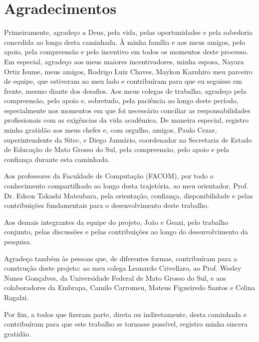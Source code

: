 \chapter*{Agradecimentos}

Primeiramente, agrade\c{c}o a Deus, pela vida, pelas oportunidades e pela sabedoria concedida ao longo desta caminhada. \`{A} minha fam\'ilia e aos meus amigos, pelo apoio, pela compreens\~ao e pelo incentivo em todos os momentos deste processo. Em especial, agrade\c{c}o aos meus maiores incentivadores, minha esposa, Nayara Ortiz Isume, meus amigos, Rodrigo Luiz Chaves, Maykon Kazuhiro meu parceiro de equipe, que estiveram ao meu lado e contribu\'iram para que eu seguisse em frente, mesmo diante dos desafios. Aos meus colegas de trabalho, agrade\c{c}o pela compreens\~ao, pelo apoio e, sobretudo, pela paci\^encia ao longo deste per\'iodo, especialmente nos momentos em que foi necess\'ario conciliar as responsabilidades profissionais com as exig\^encias da vida acad\^emica. De maneira especial, registro minha gratid\~ao aos meus chefes e, com orgulho, amigos, Paulo Cezar, superintendente da Sitec, e Diego Janu\'ario, coordenador na Secretaria de Estado de Educa\c{c}\~ao de Mato Grosso do Sul, pela compreens\~ao, pelo apoio e pela confian\c{c}a durante esta caminhada.

Aos professores da Faculdade de Computa\c{c}\~ao (FACOM), por todo o conhecimento compartilhado ao longo desta trajet\'oria, ao meu orientador, Prof. Dr. Edson Takashi Matsubara, pela orienta\c{c}\~ao, confian\c{c}a, disponibilidade e pelas contribui\c{c}\~oes fundamentais para o desenvolvimento deste trabalho.

Aos demais integrantes da equipe do projeto, Jo\~ao e Geazi, pelo trabalho conjunto, pelas discuss\~oes e pelas contribui\c{c}\~oes ao longo do desenvolvimento da pesquisa.

Agrade\c{c}o tamb\'em \`{a}s pessoas que, de diferentes formas, contribu\'iram para a constru\c{c}\~ao deste projeto: ao meu colega Leonardo Crivellaro, ao Prof. Wesley Nunes Gon\c{c}alves, da Universidade Federal de Mato Grosso do Sul, e aos colaboradores da Embrapa, Camilo Carromeu, Mateus Figueiredo Santos e Celina Ragalzi.

Por fim, a todos que fizeram parte, direta ou indiretamente, desta caminhada e contribu\'iram para que este trabalho se tornasse poss\'ivel, registro minha sincera gratid\~ao.
